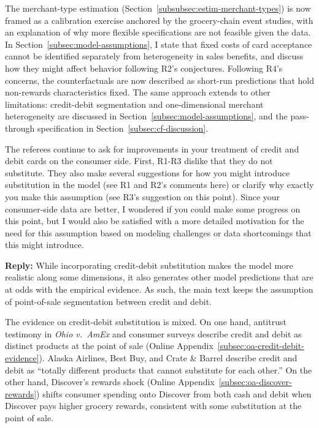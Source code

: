 \documentclass[main.tex]{subfiles}
\begin{document}
\begin{refsection}
The merchant-type estimation (Section~\ref{subsubsec:estim-merchant-types}) is now framed as a calibration exercise anchored by the grocery-chain event studies, with an explanation of why more flexible specifications are not feasible given the data.
In Section~\ref{subsec:model-assumptions}, I state that fixed costs of card acceptance cannot be identified separately from heterogeneity in sales benefits, and discuss how they might affect behavior following R2's conjectures.
Following R4's concerns, the counterfactuals are now described as short-run predictions that hold non-rewards characteristics fixed.
The same approach extends to other limitations: credit-debit segmentation and one-dimensional merchant heterogeneity are discussed in Section~\ref{subsec:model-assumptions}, and the pass-through specification in Section~\ref{subsec:cf-discussion}.

\begin{refcommentnoclear}
The referees continue to ask for improvements in your treatment of credit and debit cards on the consumer side.
First, R1-R3 dislike that they do not substitute.
They also make several suggestions for how you might introduce substitution in the model (see R1 and R2’s comments here) or clarify why exactly you make this assumption (see R3’s suggestion on this point).
Since your consumer-side data are better, I wondered if you could make some progress on this point, but I would also be satisfied with a more detailed motivation for the need for this assumption based on modeling challenges or data shortcomings that this might introduce.
\end{refcommentnoclear}

\textbf{Reply:} While incorporating credit-debit substitution makes the model more realistic along some dimensions, it also generates other model predictions that are at odds with the empirical evidence.
As such, the main text keeps the assumption of point-of-sale segmentation between credit and debit.

The evidence on credit-debit substitution is mixed.
On one hand, antitrust testimony in \emph{Ohio v.\ AmEx} and consumer surveys describe credit and debit as distinct products at the point of sale (Online Appendix~\ref{subsec:oa-credit-debit-evidence}).
Alaska Airlines, Best Buy, and Crate \& Barrel describe credit and debit as ``totally different products that cannot substitute for each other.''
On the other hand, Discover's rewards shock (Online Appendix~\ref{subsec:oa-discover-rewards}) shifts consumer spending onto Discover from both cash and debit when Discover pays higher grocery rewards, consistent with some substitution at the point of sale.


\end{refsection}
\end{document}
